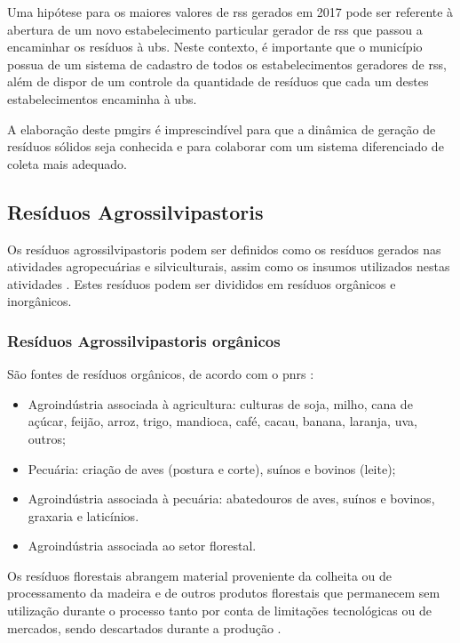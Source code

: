 	Uma hipótese para os maiores valores de \gls{rss} gerados em 2017 pode ser referente à abertura de um novo estabelecimento particular gerador de \gls{rss} que passou a encaminhar os resíduos à \gls{ubs}. Neste contexto, é importante que o município possua de um sistema de cadastro de todos os estabelecimentos geradores de \gls{rss}, além de dispor de um controle da quantidade de resíduos que cada um destes estabelecimentos encaminha à \gls{ubs}. 
	
	A elaboração deste \gls{pmgirs} é imprescindível para que a dinâmica de geração de resíduos sólidos seja conhecida e para colaborar com um sistema diferenciado de coleta mais adequado.
	
	\subsection{Resíduos Agrossilvipastoris}
	Os resíduos agrossilvipastoris podem ser definidos como os resíduos gerados nas atividades agropecuárias e silviculturais, assim como os insumos utilizados nestas atividades \cite{brasil:12305}. Estes resíduos podem ser divididos em resíduos orgânicos e inorgânicos.
	
	\subsubsection{Resíduos Agrossilvipastoris orgânicos}
	São fontes de resíduos orgânicos, de acordo com o \gls{pnrs} \cite{MMA2012}:
	
	\begin{itemize}
		\item Agroindústria associada à agricultura: culturas de soja, milho, cana de açúcar, feijão, arroz, trigo, mandioca, café, cacau, banana, laranja, uva, outros;
		\item Pecuária: criação de aves (postura e corte), suínos e bovinos (leite);
		\item Agroindústria associada à pecuária: abatedouros de aves, suínos e bovinos, graxaria e laticínios.
		\item Agroindústria associada ao setor florestal.
	\end{itemize}
	
	Os resíduos florestais abrangem material proveniente da colheita ou de processamento da madeira e de outros produtos florestais que permanecem sem utilização durante o processo tanto por conta de limitações tecnológicas ou de mercados, sendo descartados durante a produção \cite{Nolasco2000}. 
	
